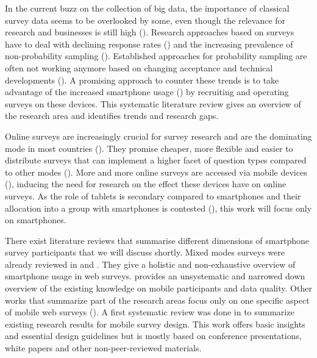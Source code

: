 In the current buzz on the collection of big data, the importance of classical survey data seems to be overlooked by some, even though the relevance for research and businesses is still high (\cite{couper_is_2013, miller_is_2017, groves_survey_2009}). Research approaches based on surveys have to deal with declining response rates (\cite{miller_is_2017}) and the increasing prevalence of non-probability sampling (\cite{couper_is_2013}). Established approaches for probability sampling are often not working anymore based on changing acceptance and technical developments (\cite{bucher_exploring_2021}). A promising approach to counter these trends is to take advantage of the increased smartphone usage (\cite{weigold_computerized_2021}) by recruiting and operating surveys on these devices. This systematic literature review gives an overview of the research area and identifies trends and research gaps. 

Online surveys are increasingly crucial for survey research and are the dominating mode in most countries (\cite{fielding_sage_2017}). They promise cheaper, more flexible and easier to distribute surveys that can implement a higher facet of question types compared to other modes (\cite{gummer_does_2019}). More and more online surveys are accessed via mobile devices (\cite{de_bruijne_mobile_2014}), inducing the need for research on the effect these devices have on online surveys. As the role of tablets is secondary compared to smartphones and their allocation into a group with smartphones is contested (\cite{couper_why_2017}), this work will focus only on smartphones. 

There exist literature reviews that summarise different dimensions of smartphone survey participants that we will discuss shortly. Mixed modes surveys were already reviewed in \cite{callegaro_mixed-mode_2013} and \cite{deleeuw_mixed-mode_2018}. They give a holistic and non-exhaustive overview of smartphone usage in web surveys. \cite{wells_what_2015} provides an unsystematic and narrowed down overview of the existing knowledge on mobile participants and data quality. Other works that summarize part of the research areas focus only on one specific aspect of mobile web surveys (\cite{couper_why_2017}). A first systematic review was done in \cite{antoun_design_2018} to summarize existing research results for mobile survey design. This work offers basic insights and essential design guidelines but is mostly based on conference presentations, white papers and other non-peer-reviewed materials. 

